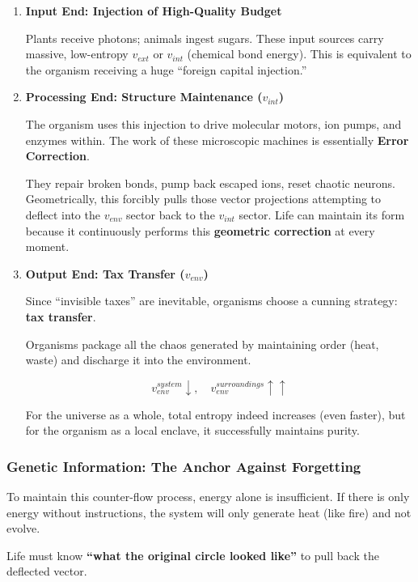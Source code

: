 \begin{enumerate}
\item \textbf{Input End: Injection of High-Quality Budget}

    Plants receive photons; animals ingest sugars. These input sources carry massive, low-entropy $v_{ext}$ or $v_{int}$ (chemical bond energy). This is equivalent to the organism receiving a huge ``foreign capital injection.''

\item \textbf{Processing End: Structure Maintenance ($v_{int}$)}

    The organism uses this injection to drive molecular motors, ion pumps, and enzymes within. The work of these microscopic machines is essentially \textbf{Error Correction}.

    They repair broken bonds, pump back escaped ions, reset chaotic neurons. Geometrically, this forcibly pulls those vector projections attempting to deflect into the $v_{env}$ sector back to the $v_{int}$ sector. Life can maintain its form because it continuously performs this \textbf{geometric correction} at every moment.

\item \textbf{Output End: Tax Transfer ($v_{env}$)}

    Since ``invisible taxes'' are inevitable, organisms choose a cunning strategy: \textbf{tax transfer}.

    Organisms package all the chaos generated by maintaining order (heat, waste) and discharge it into the environment.

    \[v_{env}^{system} \downarrow, \quad v_{env}^{surroundings} \uparrow \uparrow\]

    For the universe as a whole, total entropy indeed increases (even faster), but for the organism as a local enclave, it successfully maintains purity.
\end{enumerate}

\subsubsection{Genetic Information: The Anchor Against Forgetting}

To maintain this counter-flow process, energy alone is insufficient. If there is only energy without instructions, the system will only generate heat (like fire) and not evolve.

Life must know \textbf{``what the original circle looked like''} to pull back the deflected vector.

